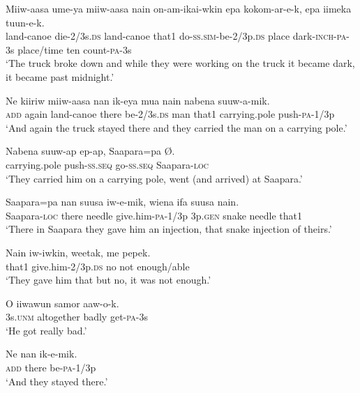 \ea
\gll  Miiw-aasa  ume-ya  miiw-aasa  nain  on-am-ikai-wkin         epa  kokom-ar-e-k,  epa  iimeka  tuun-e-k. \\
land-canoe  die-2/3s.\textsc{ds}  land-canoe  that1  do-\textsc{ss}.\textsc{sim}-be-2/3p.\textsc{ds}  place  dark-\textsc{inch}-\textsc{pa}-3s  place/time  ten  count-\textsc{pa}-3s \\


\glt ‘The truck broke down and while they were working on the truck it became dark, it became past midnight.’ \\
\z


\ea
\gll  Ne  kiiriw  miiw-aasa  nan  ik-eya  mua  nain  nabena          suuw-a-mik. \\
\textsc{add}  again  land-canoe  there  be-2/3s.\textsc{ds}  man  that1  carrying.pole push-\textsc{pa}-1/3p \\


\glt ‘And again the truck stayed there and they carried the man on a carrying pole.’ \\
\z


\ea
\gll  Nabena  suuw-ap  ep-ap,  Saapara=pa  Ø. \\
carrying.pole  push-\textsc{ss.seq}  go-\textsc{ss.seq}  Saapara-\textsc{loc} \\
\glt ‘They carried him on a carrying pole, went (and arrived) at Saapara.’ \\
\z


\ea
\gll  Saapara=pa  nan  suusa  iw-e-mik,  wiena  ifa  suusa  nain. \\
Saapara-\textsc{loc}  there  needle  give.him-\textsc{pa}-1/3p  3p.\textsc{gen}  snake  needle  that1 \\
\glt ‘There in Saapara they gave him an injection, that snake injection of theirs.’ \\
\z


\ea
\gll  Nain  iw-iwkin,  weetak,  me  pepek. \\
that1  give.him-2/3p.\textsc{ds}  no  not  enough/able \\
\glt ‘They gave him that but no, it was not enough.’ \\
\z


\ea
\gll  O  iiwawun  samor  aaw-o-k. \\
3s.\textsc{unm}  altogether  badly  get-\textsc{pa}-3s \\
\glt ‘He got really bad.’ \\
\z


\ea
\gll  Ne  nan  ik-e-mik. \\
\textsc{add}  there  be-\textsc{pa}-1/3p \\
\glt ‘And they stayed there.’ \\
\z


